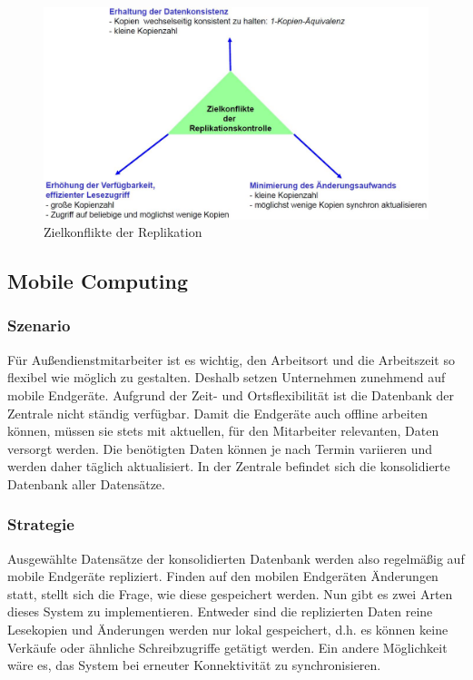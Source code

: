 \begin{figure}[!h]
	\begin{center}
		\includegraphics[width=1\linewidth]{images/konflikte.jpg}
		\caption{Zielkonflikte der Replikation \cite{leipzig2}}
		\label{konflikte}
	\end{center}
\end{figure}

\subsection{Mobile Computing}

\subsubsection{Szenario}

Für Außendienstmitarbeiter ist es wichtig, den Arbeitsort und die Arbeitszeit so flexibel wie möglich zu gestalten. Deshalb setzen Unternehmen zunehmend auf mobile Endgeräte. Aufgrund der Zeit- und Ortsflexibilität ist die Datenbank der Zentrale nicht ständig verfügbar. Damit die Endgeräte auch offline arbeiten können, müssen sie stets mit aktuellen, für den Mitarbeiter relevanten, Daten versorgt werden. Die benötigten Daten können je nach Termin variieren und werden daher täglich aktualisiert. In der Zentrale befindet sich die konsolidierte Datenbank aller Datensätze. \cite{kaiserslautern}

\subsubsection{Strategie}

Ausgewählte Datensätze der konsolidierten Datenbank werden also regelmäßig auf mobile Endgeräte repliziert. Finden auf den mobilen Endgeräten Änderungen statt, stellt sich die Frage, wie diese gespeichert werden. Nun gibt es zwei Arten dieses System zu implementieren. Entweder sind die replizierten Daten reine Lesekopien und Änderungen werden nur lokal gespeichert, d.h. es können keine Verkäufe oder ähnliche Schreibzugriffe getätigt werden. Ein andere Möglichkeit wäre es, das System bei erneuter Konnektivität zu synchronisieren. \cite{leipzig}

